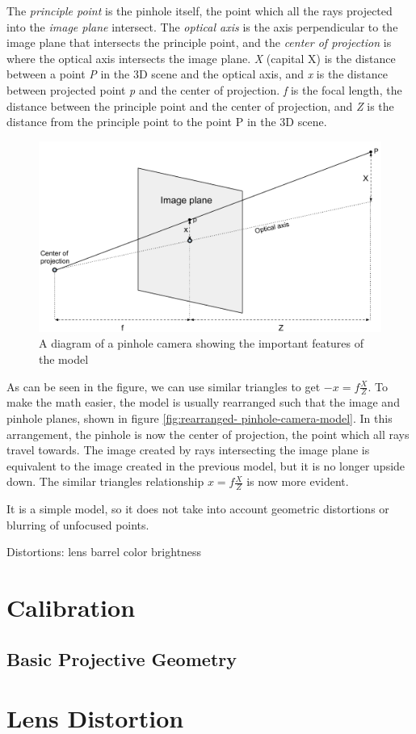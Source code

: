 The \emph{principle point} is the pinhole itself, the point which all the rays
projected into the \emph{image plane} intersect. The \emph{optical axis} is
the axis perpendicular to the image plane that intersects the principle point,
and the \emph{center of projection} is where the optical axis intersects the
image plane. \emph{X} (capital X) is the distance between a point \emph{P} in
the 3D scene and the optical axis, and \emph{x} is the distance between
projected point \emph{p} and the center of projection. \emph{f} is the focal
length, the distance between the principle point and the center of projection,
and \emph{Z} is the distance from the principle point to the point P in the 3D
scene.

\begin{figure}[h]
  \centering
  \label{fig:rearranged-pinhole-camera-model}
  \includegraphics[width=\textwidth]{images/rearranged-Pinhole-camera-model.pdf}
  \caption{A diagram of a pinhole camera showing the important features of the model}
\end{figure}

As can be seen in the figure, we can use similar triangles to get $-x =
f\frac{X}{Z}$. To make the math easier, the model is usually rearranged such
that the image and pinhole planes, shown in figure \ref{fig:rearranged-
pinhole-camera-model}. In this arrangement, the pinhole is now the center of
projection, the point which all rays travel towards. The image created by rays
intersecting the image plane is equivalent to the image created in the
previous model, but it is no longer upside down. The similar triangles
relationship $x = f\frac{X}{Z}$ is now more evident.




It is a simple model, so it does not take into account geometric distortions
or blurring of unfocused points.

Distortions:
    lens barrel
    color
    brightness



\section{Calibration}

\subsection{Basic Projective Geometry}

\section{Lens Distortion}

